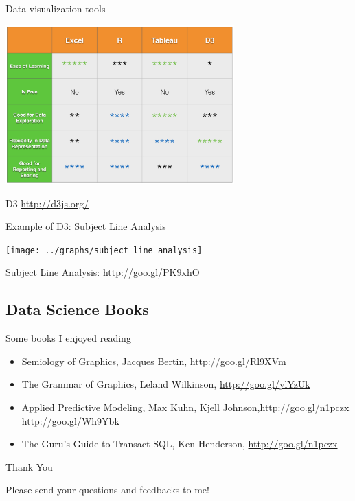 \documentclass[10pt]{beamer}
\begin{document}
    \begin{frame}{Data visualization tools}
      \begin{center}
         \includegraphics[width=250pt]{../graphs/data_visualization_tools}
      \end{center}
      {\footnotesize
        D3 \url{http://d3js.org/}
      }
    \end{frame}
   
    \begin{frame}{Example of D3: Subject Line Analysis}
      \begin{center}
        \texttt{[image: ../graphs/subject\_line\_analysis]}
      \end{center}    
      {\footnotesize Subject Line Analysis: \url{http://goo.gl/PK9xhO}}
    \end{frame}

  
  \subsection{Data Science Books}

    \begin{frame}{Some books I enjoyed reading}
      \begin{itemize}
        \item Semiology of Graphics, Jacques Bertin, \url{http://goo.gl/Rl9XVm}
        \item The Grammar of Graphics, Leland Wilkinson, \url{http://goo.gl/ylYzUk}
        \item Applied Predictive Modeling, Max Kuhn, Kjell Johnson,http://goo.gl/n1pczx \url{http://goo.gl/Wh9Ybk}
        \item The Guru's Guide to Transact-SQL, Ken Henderson, \url{http://goo.gl/n1pczx}
      \end{itemize}
    \end{frame}

    \begin{frame}{Thank You}
      \centerline{\large Please send your questions and feedbacks to me!}
    \end{frame}
\end{document}
